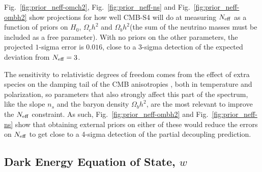 \documentclass[aps,prd,reprint,superscriptaddress,nofootinbib]{revtex4-1}
\newcommand{\reffig}[1]{Fig.~\ref{fig:#1}}
\begin{document}
%


\reffig{prior_neff-omch2}, \reffig{prior_neff-ns} and  \reffig{prior_neff-ombh2} show projections for how well CMB-S4 will do at measuring $N_{\rm eff}$ as a function of priors on $H_{0}$, $\Omega_{c}h^{2}$ and $\Omega_{b}h^{2}$(the sum of the neutrino masses must be included as a free parameter). With no priors on the other parameters, the projected $1$-sigma error is $0.016$, close to a 3-sigma detection of the expected deviation from $N_{\rm eff}=3$. 

The sensitivity to relativistic degrees of freedom comes from the effect of extra species on the damping tail of the CMB anisotropies \cite{2013PhRvD..87h3008H}, both in temperature and polarization, so parameters that also strongly affect this part of the spectrum, like the slope $n_s$ and the baryon density $\Omega_bh^2$, are the most relevant to improve the $N_{\rm eff}$ constraint. As such, \reffig{prior_neff-ombh2} and \reffig{prior_neff-ns} show that obtaining external priors on either of these would reduce the errors on $N_{\rm eff}$ to get close to a 4-sigma detection of the partial decoupling prediction.

\subsection{Dark Energy Equation of State, $w$}
\end{document}
